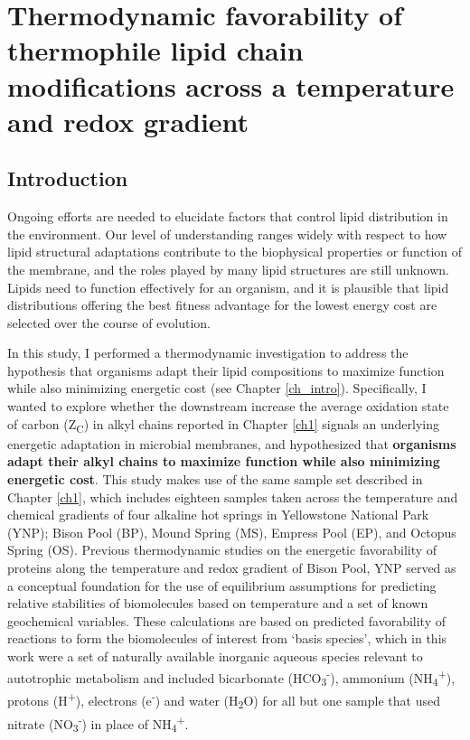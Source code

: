 \chapter[THERMODYNAMIC FAVORABILITY OF THERMOPHILE LIPID CHAIN MODIFICATIONS ACROSS A TEMPERATURE AND REDOX GRADIENT]{Thermodynamic favorability of thermophile lipid chain modifications across a temperature and redox gradient}\label{ch2}

\section{Introduction}

Ongoing efforts are needed to elucidate factors that control lipid distribution in the environment. Our level of understanding ranges widely with respect to how lipid structural adaptations contribute to the biophysical properties or function of the membrane, and the roles played by many lipid structures are still unknown. Lipids need to function effectively for an organism, and it is plausible that lipid distributions offering the best fitness advantage for the lowest energy cost are selected over the course of evolution.

In this study, I performed a thermodynamic investigation to address the hypothesis that organisms adapt their lipid compositions to maximize function while also minimizing energetic cost (see Chapter \ref{ch_intro}). Specifically, I wanted to explore whether the downstream increase the average oxidation state of carbon (Z\textsubscript{C}) in alkyl chains reported in Chapter \ref{ch1} signals an underlying energetic adaptation in microbial membranes, and hypothesized that \textbf{organisms adapt their alkyl chains to maximize function while also minimizing energetic cost}. This study makes use of the same sample set described in Chapter \ref{ch1}, which includes eighteen samples taken across the temperature and chemical gradients of four alkaline hot springs in Yellowstone National Park (YNP); Bison Pool (BP), Mound Spring (MS), Empress Pool (EP), and Octopus Spring (OS). Previous thermodynamic studies on the energetic favorability of proteins along the temperature and redox gradient of Bison Pool, YNP \citep{dick2011calculation, dick2013metastable} served as a conceptual foundation for the use of equilibrium assumptions for predicting relative stabilities of biomolecules based on temperature and a set of known geochemical variables. These calculations are based on predicted favorability of reactions to form the biomolecules of interest from `basis species', which in this work were a set of naturally available inorganic aqueous species relevant to autotrophic metabolism and included bicarbonate (HCO\textsubscript{3}\textsuperscript{-}), ammonium (NH\textsubscript{4}\textsuperscript{+}), protons (H\textsuperscript{+}), electrons (e\textsuperscript{-}) and water (H\textsubscript{2}O) for all but one sample that used nitrate (NO\textsubscript{3}\textsuperscript{-}) in place of NH\textsubscript{4}\textsuperscript{+}.

